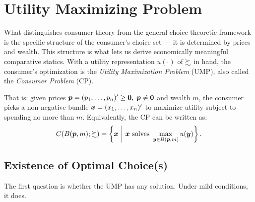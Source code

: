 \section{Utility Maximizing Problem}\label{utility-maximizing-problem}

What distinguishes consumer theory from the general choice-theoretic
framework is the specific structure of the consumer's choice set —
it is determined by prices and wealth. This structure is what lets us
derive economically meaningful comparative statics. With a utility
representation \(u(\cdot)\) of \(\succsim\) in hand, the consumer's
optimization is the \emph{Utility Maximization Problem} (UMP), also
called the \emph{Consumer Problem} (CP).


That is: given prices \(\bm p = (p_1,\ldots,p_n)'\ge \textbf 0,\;\bm p\ne\textbf 0\) and
wealth \(m\), the consumer picks a non-negative bundle
\(\bm x = (x_1,\ldots,x_n)'\) to maximize utility subject to spending no
more than \(m\). Equivalently, the CP can be written as:
\[C(B(\bm p,m);\succsim) = \left\{\bm x\ \bigg| \ \bm x \text{ solves }\max_{\bm y\in B(\bm p,m) } u(\bm y) \right\}.\]

\subsection{Existence of Optimal Choice(s)}\label{existence-of-optimal-choices}

The first question is whether the UMP has any solution. Under mild
conditions, it does.


